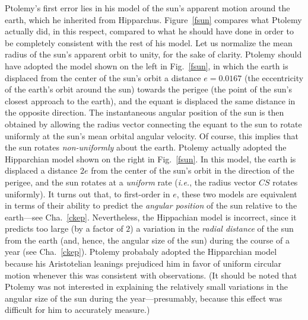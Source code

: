 Ptolemy's first error lies in his model of the sun's apparent motion around the earth, which he inherited
from Hipparchus. Figure~\ref{fsun} compares what Ptolemy actually
did, in this respect, compared to
what he should have done in order to be completely consistent
with the rest of his model. Let us normalize the mean radius of the sun's
apparent orbit  to unity, for the sake of clarity.
 Ptolemy should
have adopted the model shown on the left in Fig.~\ref{fsun}, in which the earth
is displaced from the center of the sun's orbit a distance $e=0.0167$ (the eccentricity of the earth's orbit around the sun) towards the perigee (the point of the sun's closest approach
to the earth), and the equant is displaced the same distance in the opposite
direction. The instantaneous angular position of the sun is then obtained
by allowing the radius vector connecting the equant to the sun to rotate uniformly at the sun's mean orbital angular velocity. Of course, this implies that the
sun rotates {\em non-uniformly} about the earth. Ptolemy actually adopted the Hipparchian model
shown on the right in Fig.~\ref{fsun}. In this model, the earth is displaced
a distance $2e$ from  the center of the sun's orbit in the direction of the perigee,
and the sun rotates at a {\em uniform}\/ rate ({\em i.e.}, the radius vector $CS$ rotates uniformly). It turns out that, to first-order in $e$, these two
models are equivalent in terms of their ability to predict the {\em angular position}\/ of the sun relative to the earth---see Cha.~\ref{ckep}. Nevertheless, the Hippachian
model is incorrect, since it predicts too large (by a factor of $2$) a variation in  the {\em radial distance}\/ of the sun from the earth (and, hence,  the angular size of the sun)  during the
course of a year (see Cha.~\ref{ckep}). Ptolemy probabaly adopted
the Hipparchian model because his Aristotelian leanings prejudiced him in favor of uniform circular motion whenever this was consistent with observations.
(It should be noted that Ptolemy was not  interested in explaining the relatively small variations in the angular size of the sun during the year---presumably, because this effect was difficult for him to accurately measure.)

